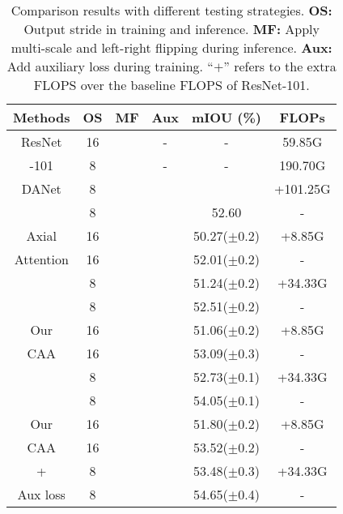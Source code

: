 \documentclass[letterpaper]{article} \usepackage{aaai22}  \usepackage{times}  \usepackage{helvet}  \usepackage{courier}  \usepackage[hyphens]{url}  \usepackage{graphicx} \urlstyle{rm} \def\UrlFont{\rm}  \usepackage{natbib}  \usepackage{caption} \DeclareCaptionStyle{ruled}{labelfont=normalfont,labelsep=colon,strut=off} \frenchspacing  \setlength{\pdfpagewidth}{8.5in}  \setlength{\pdfpageheight}{11in}  \usepackage{algorithm}
\begin{document}
\begin{table}[t]
	\centering
	\small
	\begin{tabular}{c|c|c|c|c|c} 
		\toprule[1pt]
		Methods&OS& MF &Aux& mIOU (\%) & FLOPs\\ 
		\midrule[0.5pt]
		\midrule[0.5pt]
		ResNet& 16 &   & - & - & 59.85G \\
		-101& 8 &   & - & - & 190.70G  \\
		\midrule
		DANet& 8 &   & &  & +101.25G\\ 
		     & 8 & \checkmark  & \checkmark &52.60 & -   \\ 
		\midrule
		Axial     & 16    &               &       & 50.27($\pm$0.2)&  +8.85G\\ 
		Attention & 16    & \checkmark    &       & 52.01($\pm$0.2) & -\\ 
		          & 8     &               &       & 51.24($\pm$0.2) & +34.33G\\ 
		          & 8     & \checkmark    &       &52.51($\pm$0.2)  & -   \\ 
		\midrule
		Our       & 16    &               &     & 51.06($\pm$0.2)&  +8.85G\\
		CAA       & 16    & \checkmark    &   &53.09($\pm$0.3)      & -  \\
		          & 8     &               &       & 52.73($\pm$0.1) & +34.33G\\ 
		          & 8     & \checkmark    &       & 54.05($\pm$0.1) & -   \\ 
		\midrule
		Our   & 16    &               & \checkmark & 51.80($\pm$0.2)&  +8.85G\\
		 CAA         & 16 &\checkmark& \checkmark & 53.52($\pm$0.2)& - \\
		 + & 8 &          & \checkmark& 53.48($\pm$0.3)   & +34.33G\\
		 Aux loss  & 8 & \checkmark   &\checkmark &54.65($\pm$0.4)      & - \\
		\bottomrule[1pt]
	\end{tabular}
	\caption{Comparison results with different testing strategies. 
\textbf{OS:} Output stride in training and inference. \textbf{MF:} Apply multi-scale and left-right flipping during inference. \textbf{Aux:} Add auxiliary loss during training.
		``$\bm{+}$'' refers to the extra FLOPS over the baseline FLOPS of ResNet-101. }
	\label{table:teststrategies}
\end{table}
\end{document}
